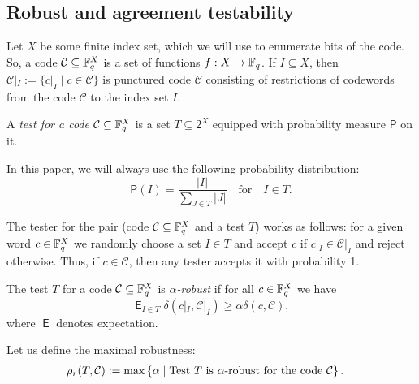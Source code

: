 \documentclass[11pt]{article}
\newcommand{\cC}{\mathcal{C}}
\newcommand{\PP}{\mathsf{P}}
\newcommand{\EE}{\mathop{\mathsf{E}}}
\begin{document}
\subsection{Robust and agreement testability}
Let $X$ be some finite index set, which we will use to enumerate bits of the code. So, a code $\cC\subseteq \F_q^X$ is a set of functions $f:X\to\mathbb{F}_q$. If $I\subseteq X$, then $\cC|_I:=\{c|_I\mid c\in \cC\}$ is punctured code $\cC$ consisting of restrictions of codewords from the code $\cC$ to the index set $I$.

\begin{definition}
    A \emph{test for a code} $\cC\subseteq \F_q^X$ is a set $T\subseteq 2^{X}$ equipped with probability measure $\PP$ on it.
\end{definition}
In this paper, we will always use the following probability distribution:
\begin{equation}\label{eqn:prob}
\PP(I)=\frac{|I|}{\sum_{J\in T}|J|}\quad\mbox{for}\quad I\in T.
\end{equation}

The tester for the pair (code $\cC\subseteq \F_q^X$ and a test $T$) works as follows: for a given word $c\in \mathbb{F}_q^X$ we randomly choose a set $I\in T$ %
and accept $c$ if $c|_I\in \cC|_I$ and reject otherwise. Thus, if $c\in \cC$, then any tester accepts it with probability 1.

\begin{definition}
    The test $T$ for a code $\cC\subseteq \F_q^X$ is \emph{$\alpha$-robust} if for all $c\in \mathbb{F}_q^X$ we have
    \[\EE_{I\in T}\delta(c|_I,\cC|_I)\ge\alpha \delta(c,\cC),\]
    where $\EE$ denotes expectation.    
\end{definition}
Let us define the maximal robustness:
\begin{align*}
  \rho_r(T,\cC)&:=\max\fbr{\alpha\mid \mbox{Test $T$ is $\alpha$-robust for the code }\cC}.
\end{align*}
\end{document}
